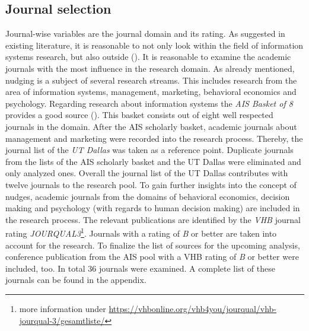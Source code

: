 \subsection{Journal selection}
Journal-wise variables are the journal domain and its rating. As suggested in existing literature, it is reasonable to not only look within the field of information systems research, but also outside (\cite{webster_analyzing_2002}). It is reasonable to examine the academic journals with the most influence in the research domain. As already mentioned, nudging is a subject of several research streams. This includes research from the area of information systems, management, marketing, behavioral economics and psychology. Regarding research about information systems the \textit{AIS Basket of 8} provides a good source (\cite{alavi_review_1992}). This basket consists out of eight well respected journals in the domain. After the AIS scholarly basket, academic journals about management and marketing were recorded into the research process. Thereby, the journal list of the \textit{UT Dallas} was taken as a reference point. Duplicate journals from the lists of the AIS scholarly basket and the UT Dallas were eliminated and only analyzed ones. Overall the journal list of the UT Dallas contributes with twelve journals to the research pool. To gain further insights into the concept of nudges, academic journals from the domains of behavioral economics, decision making and psychology (with regards to human decision making) are included in the research process. The relevant publications are identified by the \textit{VHB} journal rating \textit{JOURQUAL3}\footnote{more information under \url{https://vhbonline.org/vhb4you/jourqual/vhb-jourqual-3/gesamtliste/}}. Journals with a rating of \textit{B} or better are taken into account for the research. To finalize the list of sources for the upcoming analysis, conference publication from the AIS pool with a VHB rating of \textit{B} or better were included, too. In total 36 journals were examined. A complete list of these journals can be found in the appendix. %

